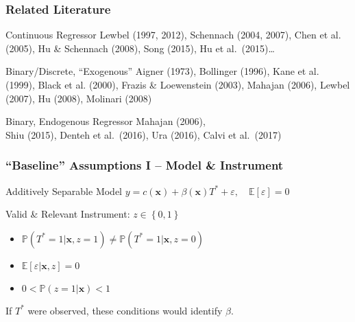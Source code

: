 \documentclass{beamer}
\begin{document}
\begin{frame}
  \frametitle{Related Literature}
 
  \begin{block}{Continuous Regressor}
    \small
  Lewbel (1997, 2012), Schennach (2004, 2007), Chen et al. (2005), Hu \& Schennach (2008), Song (2015), Hu et al.\ (2015)\ldots 
  \end{block}

  \begin{block}{Binary/Discrete, ``Exogenous''} 
    \small
   Aigner (1973), Bollinger (1996), Kane et al. (1999), Black et al. (2000), Frazis \& Loewenstein (2003), Mahajan (2006), Lewbel (2007), Hu (2008), Molinari (2008)
  \end{block}


  \begin{block}{Binary, Endogenous Regressor}
    \alert{Mahajan (2006)},\\ \small Shiu (2015), Denteh et al.\ (2016), Ura (2016), Calvi et al.\ (2017)
  \end{block}
\end{frame}
\begin{frame}
  \frametitle{``Baseline'' Assumptions I -- Model \& Instrument}

  \begin{block}{Additively Separable Model}
    $y = c(\mathbf{x}) + \beta(\mathbf{x}) T^* + \varepsilon, \quad \mathbb{E}[ \varepsilon] = 0$ 
  \end{block}

  \begin{block}{Valid \& Relevant Instrument: $z \in \left\{ 0,1 \right\}$}
    \begin{itemize}
      \item $\mathbb{P}(T^*=1|\mathbf{x},z=1) \neq \mathbb{P}(T^*=1|\mathbf{x},z=0)$
      \item $\mathbb{E}[\varepsilon|\mathbf{x},z] = 0$
      \item $0 < \mathbb{P}(z=1|\mathbf{x}) < 1$
    \end{itemize}
  \end{block}

  \begin{alertblock}{If $T^*$ were observed, these conditions would identify $\beta$.}
  \end{alertblock}
\end{frame}
\end{document}

